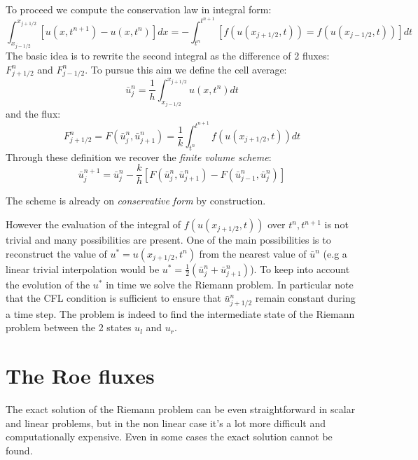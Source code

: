 \documentclass[oneside,12pt]{book}  %
\theoremstyle{plain}
\theoremstyle{definition}
\theoremstyle{remark}
\numberwithin{equation}{chapter} %
\begin{document}
To proceed we compute the conservation law in integral form:
\begin{equation}
  \label{eq:conservation_law_integral_form}
  \int_{x_{j-1/2}}^{x_{j+1/2}}[u(x,t^{n+1})-u(x,t^n)]dx=-\int_{t^n}^{t^{n+1}}[f(u(x_{j+1/2},t))=f(u(x_{j-1/2},t))]dt
\end{equation}
The basic idea is to rewrite the second integral as the difference of
2 fluxes: $F^{n}_{j+1/2}$ and $F^{n}_{j-1/2}$. 
To pursue this aim we define the cell average:
\begin{equation}
  \label{eq:cell_average}
  \bar{u}^{n}_{j}=\frac{1}{h}\int_{x_{j-1/2}}^{x_{j+1/2}}u(x,t^{n})dt
\end{equation}
and the flux:
\begin{equation}
  \label{eq:generic_flux}
  F^{n}_{j+1/2}=F(\bar{u}^{n}_{j},\bar{u}^{n}_{j+1})=\frac{1}{k}\int_{t^n}^{t^{n+1}}f(u(x_{j+1/2},t))dt
\end{equation}
Through these definition we recover the \textit{finite volume scheme}:
\begin{equation}
  \label{eq:generic_finite_volume}
  \bar{u}^{n+1}_{j}=\bar{u}^{n}_{j}-\frac{k}{h}[F(\bar{u}^{n}_{j},\bar{u}^{n}_{j+1})-F(\bar{u}^{n}_{j-1},\bar{u}^{n}_{j})]
\end{equation}

The scheme is already on \textit{conservative form} by construction.

However the evaluation of the integral of $f(u(x_{j+1/2},t))$ over
$t^n,t^{n+1}$ is not trivial and many possibilities are present.
One of the main possibilities is to reconstruct the value of
$u^*=u(x_{j+1/2},t^n)$ from the nearest value of $\bar{u}^n$ (e.g a
linear trivial interpolation would be
$u^*=\frac{1}{2}(\bar{u}^n_j+\bar{u}^n_{j+1})$). To keep into account
the evolution of the $u^*$ in time we solve the Riemann problem. In
particular note that the CFL condition is sufficient to ensure that
$\bar{u}^n_{j+1/2}$ remain constant during a time step. The problem is
indeed to find the intermediate state of the Riemann problem  between
the 2 states $u_l$ and $u_r$.

\section{The Roe fluxes}
The exact solution of the Riemann problem can be even straightforward in
scalar and linear problems, but in the non linear case it's a lot more
difficult and computationally expensive. Even in some cases the exact
solution cannot be found.
\end{document}
